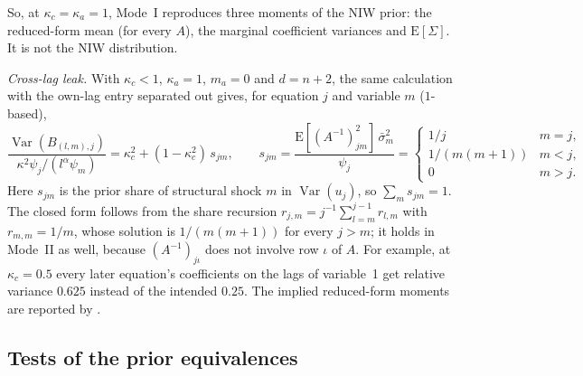 So, at $\kappa_c = \kappa_a = 1$, Mode~I reproduces three moments of the NIW prior: the
reduced-form mean (for every $A$), the marginal coefficient variances and $\mathrm{E}[\Sigma]$.
It is not the NIW distribution.

\emph{Cross-lag leak.}
With $\kappa_c < 1$, $\kappa_a = 1$, $m_a = 0$ and $d = n + 2$, the same calculation with the own-lag
entry separated out gives, for equation $j$ and variable $m$ ($1$-based),
\begin{equation}\label{eq:leak}
\frac{\operatorname{Var}(B_{(l,m),j})}{\kappa^2\psi_j/(l^\alpha\psi_m)} = \kappa_c^2 + (1 -
\kappa_c^2)\, s_{jm}, \qquad
s_{jm} = \frac{\mathrm{E}[(A^{-1})^2_{jm}]\,\bar\sigma^2_m}{\psi_j} =
\begin{cases} 1/j & m = j,\\ 1/(m(m+1)) & m < j,\\ 0 & m > j. \end{cases}
\end{equation}
Here $s_{jm}$ is the prior share of structural shock $m$ in $\operatorname{Var}(u_j)$, so $\sum_m
s_{jm} = 1$.
The closed form follows from the share recursion $r_{j,m} = j^{-1}\sum_{l=m}^{j-1} r_{l,m}$ with
$r_{m,m} = 1/m$, whose solution is $1/(m(m+1))$ for every $j > m$; it holds in Mode~II as well,
because $(A^{-1})_{j\iota}$ does not involve row $\iota$ of $A$.
For example, at $\kappa_c = 0.5$ every later equation's coefficients on the lags of variable~1 get
relative variance $0.625$ instead of the intended $0.25$.
The implied reduced-form moments are reported by .

\subsection{Tests of the prior equivalences}\label{app:prior-tests}

